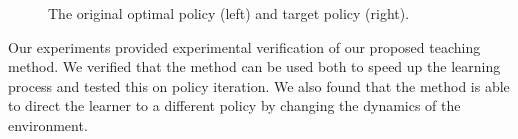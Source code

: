 \begin{figure}[ht]
\centerline{}
\caption{\label{envdopt}The original optimal policy (left) and target policy (right).}
\end{figure}

Our experiments provided experimental verification of our proposed teaching method.  We verified that the method can be used both to speed up the learning process and tested this on policy iteration.  We also found that the method is able to direct the learner to a different policy by changing the dynamics of the environment.
